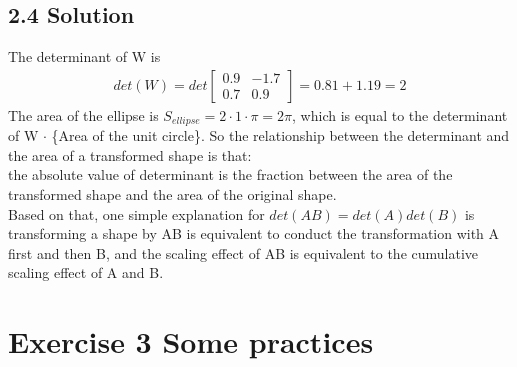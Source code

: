 \documentclass{article}
\begin{document}

\subsection*{2.4 Solution}
The determinant of W is
\begin{align*}
    det(W) = det \begin{bmatrix} 0.9 & -1.7 \\ 0.7 & 0.9 \end{bmatrix} = 0.81 + 1.19 = 2
\end{align*}
The area of the ellipse is $S_{ellipse} = 2 \cdot 1 \cdot \pi = 2 \pi$, which is equal to the determinant of W $\cdot$ \{Area of the unit circle\}. So the relationship between the determinant and the area of a transformed shape is that: \\
the absolute value of determinant is the fraction between the area of the transformed shape and the area of the original shape. \\
Based on that, one simple explanation for $det(AB) = det(A) det(B)$ is transforming a shape by AB is equivalent to conduct the transformation with A first and then B, and the scaling effect of AB is equivalent to the cumulative scaling effect of A and B.


\section*{Exercise 3 Some practices}
\end{document}
